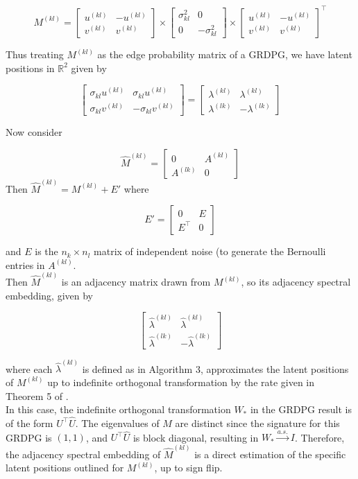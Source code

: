\documentclass[12pt]{article}
\begin{document}
\[M^{(kl)} = 
\begin{bmatrix} u^{(kl)} & -u^{(kl)} \\ v^{(kl)} & v^{(kl)} \end{bmatrix} \times 
\begin{bmatrix} \sigma^2_{kl} & 0 \\ 0 & -\sigma^2_{kl} \end{bmatrix} \times
\begin{bmatrix} u^{(kl)} & -u^{(kl)} \\ v^{(kl)} & v^{(kl)} \end{bmatrix}^\top\]

Thus treating \(M^{(kl)}\) as the edge probability matrix of a GRDPG, we
have latent positions in \(\mathbb{R}^2\) given by

\[\begin{bmatrix} 
  \sigma_{kl} u^{(kl)} & \sigma_{kl} u^{(kl)} \\ 
  \sigma_{kl} v^{(kl)} & -\sigma_{kl} v^{(kl)} 
\end{bmatrix} = 
\begin{bmatrix} 
  \lambda^{(kl)} & \lambda^{(kl)} \\ 
  \lambda^{(lk)} & -\lambda^{(lk)} 
\end{bmatrix}\]

Now consider

\[\hat{M}^{(kl)} = \begin{bmatrix} 0 & A^{(kl)} \\ A^{(lk)} & 0 \end{bmatrix}\]
Then \(\hat{M}^{(kl)} = M^{(kl)} + E'\) where

\[E' = \begin{bmatrix} 0 & E \\ E^\top & 0 \end{bmatrix}\]

and \(E\) is the \(n_k \times n_l\) matrix of independent noise (to
generate the Bernoulli entries in \(A^{(kl)}\).\\
Then \(\hat{M}^{(kl)}\) is an adjacency matrix drawn from \(M^{(kl)}\),
so its adjacency spectral embedding, given by

\[\begin{bmatrix} 
  \hat{\lambda}^{(kl)} & \hat{\lambda}^{(kl)} \\ 
  \hat{\lambda}^{(lk)} & -\hat{\lambda}^{(lk)} 
\end{bmatrix}\]

where each \(\hat{\lambda}^{(kl)}\) is defined as in Algorithm 3,
approximates the latent positions of \(M^{(kl)}\) up to indefinite
orthogonal transformation by the rate given in Theorem 5 of
\citeauthor{rubindelanchy2017statistical}.\\
In this case, the indefinite orthogonal transformation \(W_*\) in the
GRDPG result \cite{rubindelanchy2017statistical} is of the form
\(U^\top \hat{U}\). The eigenvalues of \(M\) are distinct since the
signature for this GRDPG is \((1, 1)\), and \(U^\top \hat{U}\) is block
diagonal, resulting in \(W_* \stackrel{a.s.}{\to} I\). Therefore, the
adjacency spectral embedding of \(\hat{M}^{(kl)}\) is a direct
estimation of the specific latent positions outlined for \(M^{(kl)}\),
up to sign flip.

\renewcommand\refname{References}
  
\end{document}
